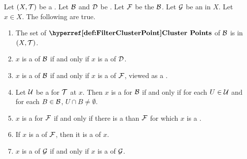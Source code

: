\begin{prop}
\label{prop:FilterClusterPoint}
Let $(X,\mathcal{T})$ be a \TopologicalSpace.
Let $\mathcal{B}$ and $\mathcal{D}$ be \FilterBaseEquivalent \FilterBases. 
Let $\mathcal{F}$ be the \FilterGeneratedBy $\mathcal{B}$.
Let $\mathcal{G}$ be an \UltraFilter in $X$. 
Let $x \in X$. 
The following are true. 
\begin{enumerate}[label=(\roman*), ref={\ref{prop:FilterClusterPoint}.~\roman*}]
\item 
\label{prop:FilterClusterPoint:Closed}
The set of $\FilterClusterPoints$ of $\mathcal{B}$ is \SetClosed in $(X,\mathcal{T})$. 
\item
\label{prop:FilterClusterPoint:Equivalent}
$x$ is a \FilterClusterPoint of $\mathcal{B}$ 
if and only if 
$x$ is a \FilterClusterPoint of $\mathcal{D}$.
\item 
\label{prop:FilterClusterPoint:Filter}
$x$ is a \FilterClusterPoint of $\mathcal{B}$ 
if and only if 
$x$ is a \FilterClusterPoint of $\mathcal{F}$, viewed as a \FilterBase.

\item 
\label{prop:FilterClusterPoint:FundamentalSystem}
Let $\mathcal{U}$ be a \FundamentalSystemOfNeighborhoods for $\mathcal{T}$ at $x$. 
Then $x$ is a \FilterClusterPoint for $\mathcal{B}$ if and only if for each $U \in \mathcal{U}$ and 
for each $B \in \mathcal{B}$, $U \cap B\neq \emptyset$. 
\item 
\label{prop:FilterClusterPoint:Finer}
$x$ is a \FilterClusterPoint for $\mathcal{F}$ if and only if there is a 
\Filter \FinerFilter than $\mathcal{F}$ for which $x$ is a \FilterLimit. 
\item 
\label{prop:FilterClusterPoint:FilterLimit}
If $x$ is a \FilterLimit of $\mathcal{F}$, then it is a \FilterClusterPoint of $x$. 
\item 
\label{prop:FilterClusterPoint:Ultrafilter}
$x$ is a \FilterClusterPoint of $\mathcal{G}$ if and only if $x$ is a \FilterLimit of $\mathcal{G}$. 



\end{enumerate}
\end{prop}
